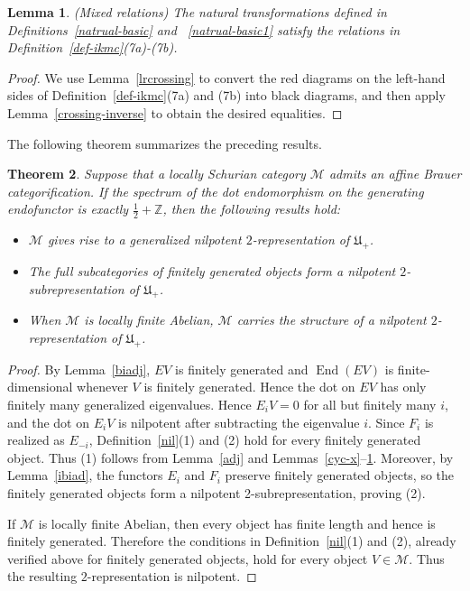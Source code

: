 \documentclass[a4,10pt]{amsart}
\numberwithin{equation}{section}
\def\End{\operatorname{End}}
\newtheorem{Theorem}{Theorem}[section] %
\newtheorem{Lemma}[Theorem]{Lemma}
\theoremstyle{definition}
\begin{document}
\begin{Lemma} \label{mixedup1} (Mixed relations) The natural transformations defined in Definitions~\ref{natrual-basic} and ~\ref{natrual-basic1} satisfy the relations  in Definition~\ref{def-ikmc}(7a)-(7b).\end{Lemma} 
\begin{proof}
We use Lemma~\ref{lrcrossing} to convert the red diagrams on the left-hand sides of  Definition~\ref{def-ikmc}(7a) and (7b) into  black diagrams, and then apply Lemma~\ref{crossing-inverse} to obtain the desired equalities.%
\end{proof}
The following theorem summarizes the preceding results.
\begin{Theorem}\label{thm:mainthmaffinebu}
Suppose that a locally Schurian category $\mathcal M$ admits an affine Brauer categorification.
 If the spectrum of the dot endomorphism on the generating endofunctor is exactly  $\frac12+\mathbb Z$, then the following results hold: \begin{itemize} \item [(1)]   $\mathcal M$ gives rise
    to a generalized nilpotent $2$-representation of
    $\mathfrak U_+$.
\item[(2)] The full subcategories  of finitely generated objects form  a nilpotent $2$-subrepresentation of $\mathfrak U_+$.
\item [(3)] When $\mathcal M$ is locally finite Abelian, $\mathcal M$ carries the structure of a nilpotent   $2$-representation of $\mathfrak U_+$. \end{itemize} 
\end{Theorem}

\begin{proof}By Lemma~\ref{biadj}, $EV$ is finitely generated and  
 $\End(EV)$ is finite-dimensional whenever $V$ is finitely generated. Hence  
the dot on $EV$ has only
finitely many generalized eigenvalues. Hence $E_iV = 0$ for all but finitely many $i$, and the dot on $E_iV$ is
nilpotent after subtracting the eigenvalue $i$. Since $F_i$ is realized as $E_{-i}$, Definition~\ref{nil}(1) and (2) hold for
every finitely generated object.
  Thus  (1) follows from Lemma~\ref{adj} and Lemmas~\ref{cyc-x}--\ref{mixedup1}. Moreover, by Lemma~\ref{ibiad},   the
functors $E_i$ and $F_i$  preserve finitely generated objects, so the finitely generated objects form a
nilpotent 2-subrepresentation, proving (2).


If $\mathcal M$ is locally finite Abelian, then every object has finite length and hence is finitely generated.  
Therefore  the conditions in Definition~\ref{nil}(1) and (2), already verified above for finitely generated objects, hold for every object $V\in \mathcal M$. Thus the resulting $2$-representation
is nilpotent.
\end{proof}
\end{document}
